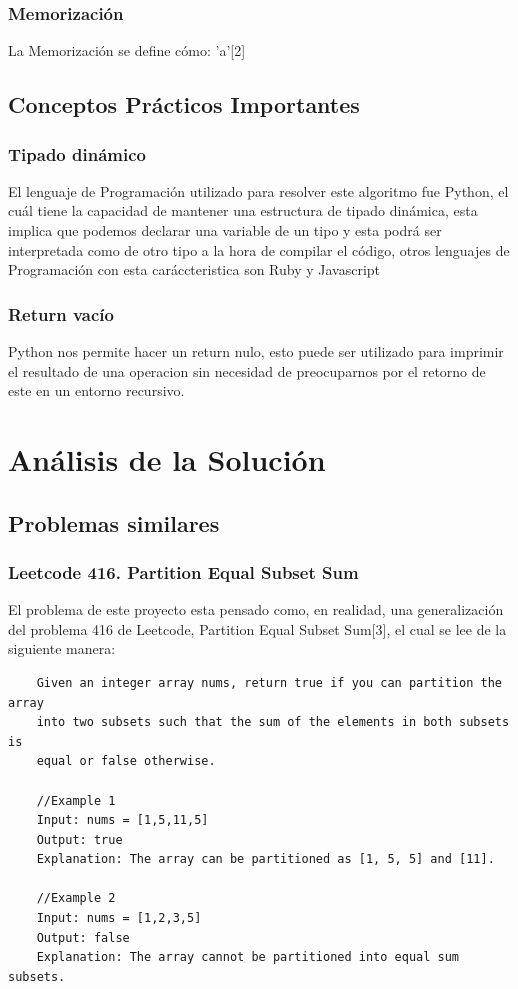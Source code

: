 \documentclass[a4paper]{article}
\begin{document}
\subsubsection{Memorización}
La Memorización se define cómo: 'a'[2]

\subsection{Conceptos Prácticos Importantes}
\subsubsection{Tipado dinámico}
El lenguaje de Programación utilizado para resolver este algoritmo fue Python,
el cuál tiene la capacidad de mantener una estructura de tipado dinámica, esta
implica que podemos declarar una variable de un tipo y esta podrá ser interpretada
como de otro tipo a la hora de compilar el código, otros lenguajes de Programación
con esta caráccteristica son Ruby y Javascript

\subsubsection{Return vacío}
Python nos permite hacer un return nulo, esto puede ser utilizado para imprimir el
resultado de una operacion sin necesidad de preocuparnos por el retorno de este en un
entorno recursivo.

\section{Análisis de la Solución}
\subsection{Problemas similares}
\subsubsection{Leetcode 416. Partition Equal Subset Sum}
El problema de este proyecto esta pensado como, en realidad, una generalización
del problema 416 de Leetcode, Partition Equal Subset Sum[3], el cual se lee de la siguiente manera:

\begin{verbatim}
    Given an integer array nums, return true if you can partition the array
    into two subsets such that the sum of the elements in both subsets is 
    equal or false otherwise.

    //Example 1
    Input: nums = [1,5,11,5]
    Output: true
    Explanation: The array can be partitioned as [1, 5, 5] and [11].

    //Example 2
    Input: nums = [1,2,3,5]
    Output: false
    Explanation: The array cannot be partitioned into equal sum subsets.
\end{verbatim} 
\end{document}
